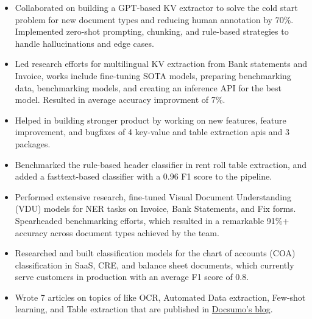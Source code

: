\documentclass[a4paper]{article}
\begin{document}
\begin{itemize} \itemsep 0pt
	\item Collaborated on building a GPT-based KV extractor to solve the cold start problem for new document types and reducing human annotation by 70\%. Implemented zero-shot prompting, chunking, and rule-based strategies to handle hallucinations and edge cases.
	\item Led research efforts for multilingual KV extraction from Bank statements and Invoice, works include fine-tuning SOTA models, preparing benchmarking data, benchmarking models, and creating an inference API for the best model. Resulted in average accuracy improvment of 7\%.
	\item Helped in building stronger product by working on new features, feature improvement, and bugfixes of 4 key-value and table extraction apis and 3 packages.
	\item Benchmarked the rule-based header classifier in rent roll table extraction, and added a fasttext-based classifier with a 0.96 F1 score to the pipeline.
	\item Performed extensive research, fine-tuned Visual Document Understanding (VDU) models for NER tasks on Invoice, Bank Statements, and Fix forms. Spearheaded benchmarking efforts, which resulted in a remarkable 91\%+ accuracy across document types achieved by the team.
	\item Researched and built classification models for the chart of accounts (COA) classification in SaaS, CRE, and balance sheet documents, which currently serve customers in production with an average F1 score of 0.8.
	\item Wrote 7 articles on topics of like OCR, Automated Data extraction, Few-shot learning, and Table extraction that are published in \href{https://www.docsumo.com/blog-authors/amit-timalsina}{\color{blue}Docsumo's blog}.
\end{itemize}
\end{document}
